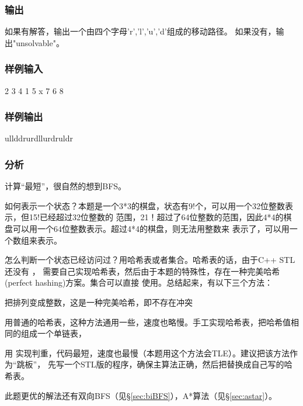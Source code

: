 \subsubsection{输出}
如果有解答，输出一个由四个字母'r','l','u','d'组成的移动路径。
如果没有，输出"unsolvable"。 

\subsubsection{样例输入}
\begin{Code}
2  3  4  1  5  x  7  6  8
\end{Code}

\subsubsection{样例输出}
\begin{Code}
ullddrurdllurdruldr
\end{Code}

\subsubsection{分析}
计算“最短”，很自然的想到BFS。

如何表示一个状态？本题是一个3*3的棋盘，状态有9!个，可以用一个32位整数表示，但15!已经超过32位整数的
范围，21！超过了64位整数的范围，因此4*4的棋盘可以用一个64位整数表示。超过4*4的棋盘，则无法用整数来
表示了，可以用一个数组来表示。

怎么判断一个状态已经访问过？用哈希表或者集合。哈希表的话，由于C++ STL 还没有 ，
需要自己实现哈希表，然后由于本题的特殊性，存在一种完美哈希(perfect hashing)方案。集合可以直接
使用。总结起来，有以下三个方法：
\begindot
\item 把排列变成整数，这是一种完美哈希，即不存在冲突
\item 用普通的哈希表，这种方法通用一些，速度也略慢。手工实现哈希表，把哈希值相同的组成一个单链表，
\item 用  实现判重，代码最短，速度也最慢（本题用这个方法会TLE）。建议把该方法作为“跳板”，
先写一个STL版的程序，确保主算法正确，然后把替换成自己写的哈希表。
\myenddot

此题更优的解法还有双向BFS（见\S \ref{sec:biBFS}），A*算法（见\S \ref{sec:astar}）。

